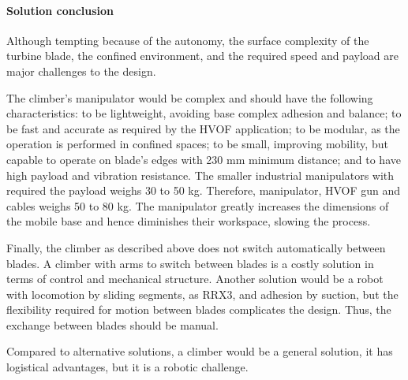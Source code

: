 

\paragraph{Solution conclusion}
Although tempting because of the autonomy, the surface complexity of the
turbine blade, the confined environment, and the required speed and payload are
major challenges to the design. 

The climber's manipulator would be complex and should have the
following characteristics: to be lightweight, avoiding base complex adhesion and
balance; to be fast and accurate as required by the HVOF application; to be
modular, as the operation is performed in confined spaces; to
be small, improving mobility, but capable to operate on blade's edges with 230
mm minimum distance; and to have high payload and vibration resistance. The
smaller industrial manipulators with required the payload weighs 30 to 50 kg.
Therefore, manipulator, HVOF gun and cables weighs 50 to 80 kg. The
manipulator greatly increases the dimensions of the mobile base and hence
diminishes their workspace, slowing the process.

Finally, the climber as described above does not switch automatically between
blades. A climber with arms to switch between blades is a costly solution in
terms of control and mechanical structure. Another solution would be a robot with
locomotion by sliding segments, as RRX3, and adhesion by suction, but the
flexibility required for motion between blades complicates the design. Thus,
the exchange between blades should be manual.

Compared to alternative solutions, a climber would be a general solution,
it has logistical advantages, but it is a robotic challenge. 

